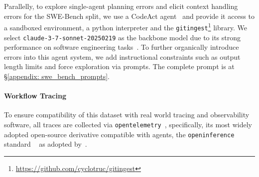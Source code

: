 \documentclass[11pt]{article}
\begin{document}
Parallelly, to explore single-agent planning errors and elicit context handling errors for the SWE-Bench split, we use a CodeAct agent~\cite{wang2024codeact} and provide it access to a sandboxed environment, a python interpreter and the \verb|gitingest|\footnote{\url{https://github.com/cyclotruc/gitingest}} library. We select \verb|claude-3-7-sonnet-20250219| as the backbone model due to its strong performance on software engineering tasks~\cite{anthropic_claude_3_7_sonnet}. To further organically introduce errors into this agent system, we add instructional constraints such as output length limits and force exploration via prompts. The complete prompt is at \S\ref{appendix: swe_bench_prompts}.

\paragraph{Workflow Tracing}
To ensure compatibility of this dataset with real world tracing and observability software, all traces are collected via \verb|opentelemetry|~\cite{opentelemetry}, specifically, its most widely adopted open-source derivative compatible with agents, the \verb|openinference| standard ~\cite{openinference} as adopted by~\citet{moshkovich2025beyond}. 
\end{document}
